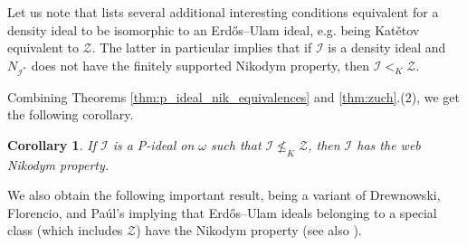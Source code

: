 \documentclass[a4paper,11pt,fleqn]{amsart}
\newtheorem{corollary}[theorem]{Corollary}
\theoremstyle{definition}
\theoremstyle{remark}
\numberwithin{equation}{section}
\newcommand{\iI}{\mathcal{I}}
\newcommand{\zZ}{\mathcal{Z}}
\newcommand{\erdos}{{Erd\H{o}s}}
\begin{document}
Let us note that \cite[Theorem 5.5]{Zuc25} lists several additional interesting conditions equivalent for a density ideal to be isomorphic to an \erdos--Ulam ideal, e.g. being Kat\v{e}tov equivalent to $\zZ$. The latter in particular implies that if $\iI$ is a density ideal and $N_{\iI^*}$ does not have the finitely supported Nikodym property, then $\iI<_K\zZ$.

Combining Theorems \ref{thm:p_ideal_nik_equivalences} and \ref{thm:zuch}.(2), we get the following corollary.

\begin{corollary}\label{cor:not_lek_z_web_nik}
    If $\iI$ is a P-ideal on $\omega$ such that $\iI\not\le_K\zZ$, then $\iI$ has the web Nikodym property.
\end{corollary}

We also obtain the following important result, being a variant of Drewnowski, Florencio, and Pa\'ul's \cite[Example 4.3]{DFP96} implying that \erdos--Ulam ideals belonging to a special class (which includes $\zZ$) have the Nikodym property (see also \cite[Theorem 6.8]{DP00}). 
\end{document}
